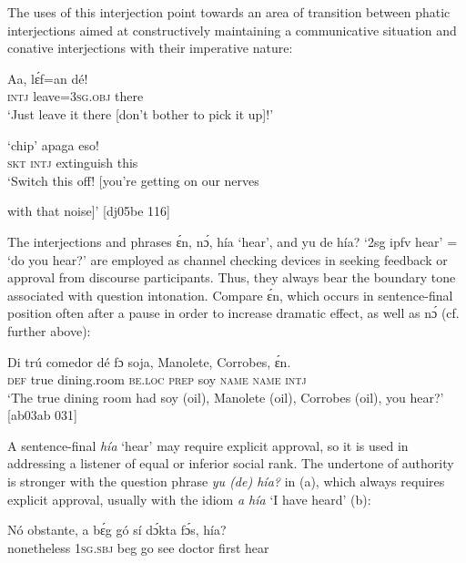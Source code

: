 The uses of this interjection point towards an area of transition between phatic interjections aimed at constructively maintaining a communicative situation and conative interjections with their imperative nature: 



\ea%
    \label{ex:key:1655}
    \gll Aa,  lɛ́f=an    dé!\\
\textsc{intj}  leave=\textsc{3sg.obj}  there\\

\glt ‘Just leave it there [don’t bother to pick it up]!’ 
\z


\ea%
    \label{ex:key:1656}
    \gll ‘chip’    apaga    eso!\\
\textsc{skt}    \textsc{intj}  extinguish  this\\

\glt ‘Switch this off! [you’re getting on our nerves 


\glt with that noise]’ [dj05be 116]
\z

The interjections and phrases ɛ́n, nɔ́, hía ‘hear’, and yu de hía? ‘2sg ipfv hear’ = ‘do you hear?’ are employed as channel checking devices in seeking feedback or approval from discourse participants. Thus, they always bear the boundary tone associated with question intonation. Compare ɛ́n, which occurs in sentence-final position often after a pause in order to increase dramatic effect, as well as nɔ́ (cf.  further above): 


\ea%
    \label{ex:key:1657}
    \gll Di  trú  comedor    dé    fɔ  soja,    Manolete,
Corrobes,  ɛ́n.\\
\textsc{def}  true  dining.room  \textsc{be.loc}  \textsc{prep}  soy    \textsc{name}
\textsc{name}    \textsc{intj}\\
\glt ‘The true dining room had soy (oil), Manolete (oil), 
Corrobes (oil), you hear?’ [ab03ab 031]
\z

A sentence-final \textit{hía} ‘hear’ may require explicit approval, so it is used in addressing a listener of equal or inferior social rank. The undertone of authority is stronger with the question phrase \textit{yu (de) hía?} in (a), which always requires explicit approval, usually with the idiom \textit{a hía} ‘I have heard’ (b): 


\ea%
    \label{ex:key:1658}
    \gll Nó  obstante,  a    bɛ́g  gó  sí  dɔ́kta  fɔ́s,  hía?\\
nonetheless    \textsc{1sg.sbj}  beg  go  see  doctor  first  hear\\

